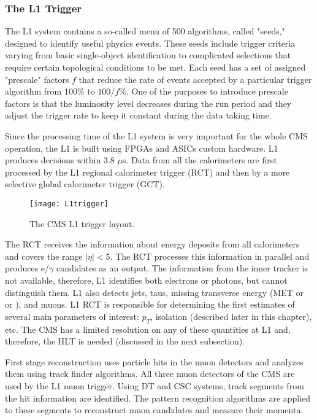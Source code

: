 \begin{normalsize}
\subsubsection{The L1 Trigger}


The L1 system \cite{CMS_TDR} contains a so-called menu of 500 algorithms, called "seeds," designed to identify useful physics events. These seeds include trigger criteria varying from basic single-object identification to complicated selections that require certain topological conditions to be met. Each seed has a set of assigned "prescale" factors $f$ that reduce the rate of events accepted by a particular trigger algorithm from 100$\%$ to $100/f\%$. One of the purposes to introduce prescale factors is that the luminosity level decreases during the run period and they adjust the trigger rate to keep it constant during the data taking time. 

Since the processing time of the L1 system is very important for the whole CMS operation, the L1 is built using FPGAs and ASICs custom hardware. L1 produces decisions within 3.8 $\mu$s. Data from all the calorimeters are first processed by the L1 regional calorimeter trigger (RCT) and then by a more selective global calorimeter trigger (GCT). 


 \begin{figure}[H]
  \centering
  \texttt{[image: L1trigger]}
  \caption[The CMS L1 trigger layout]{The CMS L1 trigger layout.}
  \label{L1trigger}
\end{figure}

The RCT receives the information about energy deposits from all calorimeters and covers the range $|\eta|<$5. The RCT processes this information in parallel and produces e/$\gamma$ candidates as an output. The information from the inner tracker is not available, therefore, L1 identifies both electrons or photons, but cannot distinguish them. L1 also detects jets, taus, missing transverse energy (MET or \ETslash or \PTslash), and muons. L1 RCT is responsible for determining the first estimates of several main parameters of interest: $p_T$, isolation (described later in this chapter), etc. The CMS has a limited resolution on any of these quantities at L1 and, therefore, the HLT is needed (discussed in the next subsection).

First stage reconstruction uses particle hits in the muon detectors and analyzes them using track finder algorithms. All three muon detectors of the CMS are used by the L1 muon trigger. Using DT and CSC systems, track segments from the hit information are identified. The pattern recognition algorithms are applied to these segments to reconstruct muon candidates and measure their momenta. 


\end{normalsize}
